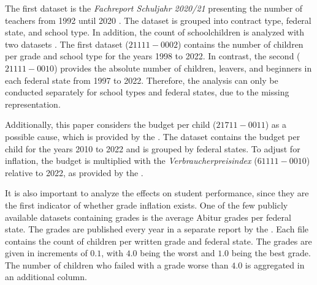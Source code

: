 The first dataset is the \textit{Fachreport Schuljahr 2020/21} presenting the number of teachers from 1992 until 2020 \cite{statistische_bundesamt_allgemeinbildende_2022}. The dataset is grouped into contract type, federal state, and school type. In addition, the count of schoolchildren is analyzed with two datasets \cite{statistische_bundesamt_statistisches_2024}. The first dataset (\href{https://www-genesis.destatis.de/genesis//online?operation=table&code=21111-0002&bypass=true&levelindex=0&levelid=1706352545984#abreadcrumb}{$21111-0002$}) contains the number of children per grade and school type  for the years 1998 to 2022. In contrast, the second (\href{https://www-genesis.destatis.de/genesis//online?operation=table&code=21111-0010&bypass=true&levelindex=0&levelid=1706352536762#abreadcrumb}{$21111-0010$}) provides the absolute number of children, leavers, and beginners in each federal state from 1997 to 2022. Therefore, the analysis can only be conducted separately for school types and federal states, due to the missing representation.

Additionally, this paper considers the budget per child (\href{https://www-genesis.destatis.de/genesis//online?operation=table&code=21711-0011&bypass=true&levelindex=0&levelid=1706352648560#abreadcrumb}{$21711-0011$}) as a possible cause, which is provided  by the \citeauthor{statistische_bundesamt_statistisches_2024}. The dataset contains the budget per child for the years 2010 to 2022 and is grouped by federal states. To adjust for inflation, the budget is multiplied with the \textit{Verbraucherpreisindex} (\href{https://www-genesis.destatis.de/genesis//online?operation=table&code=61111-0010&bypass=true&levelindex=0&levelid=1706352769529#abreadcrumb}{$61111-0010$}) relative to 2022, as provided by the \citeauthor{statistische_bundesamt_statistisches_2024}. 


It is also important to analyze the  effects on student performance, since they are the first indicator of whether grade inflation exists. One of the few publicly available datasets containing grades is the average Abitur grades per federal state. The grades are published every year in a separate report by the \citeauthor{kultusminister_konferenz_abiturnoten_nodate}. Each file contains the count of children per written grade and federal state. The grades are given in increments of $0.1$, with $4.0$  being the worst and $1.0$ being the best grade. The number of children who failed with a grade worse than $4.0$ is aggregated in an additional column. 

